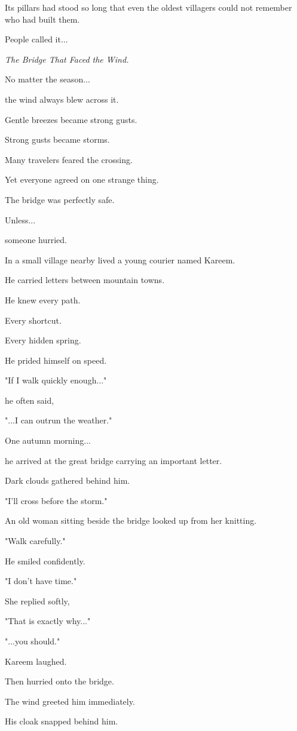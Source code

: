 \documentclass[12pt,openany]{book}
\begin{document}
Its pillars had stood so long that even the oldest villagers could not remember who had built them.

People called it...

\emph{The Bridge That Faced the Wind.}

No matter the season...

the wind always blew across it.

Gentle breezes became strong gusts.

Strong gusts became storms.

Many travelers feared the crossing.

Yet everyone agreed on one strange thing.

The bridge was perfectly safe.

Unless...

someone hurried.

In a small village nearby lived a young courier named Kareem.

He carried letters between mountain towns.

He knew every path.

Every shortcut.

Every hidden spring.

He prided himself on speed.

"If I walk quickly enough..."

he often said,

"...I can outrun the weather."

One autumn morning...

he arrived at the great bridge carrying an important letter.

Dark clouds gathered behind him.

"I'll cross before the storm."

An old woman sitting beside the bridge looked up from her knitting.

"Walk carefully."

He smiled confidently.

"I don't have time."

She replied softly,

"That is exactly why..."

"...you should."

Kareem laughed.

Then hurried onto the bridge.

The wind greeted him immediately.

His cloak snapped behind him.
\end{document}
